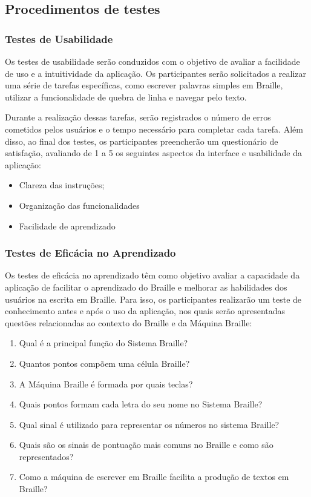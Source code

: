 \subsection{Procedimentos de testes}

\subsubsection{Testes de Usabilidade}

Os testes de usabilidade serão conduzidos com o objetivo de avaliar a facilidade de uso e a intuitividade da aplicação. Os participantes serão solicitados a realizar uma série de tarefas específicas, como escrever palavras simples em Braille, utilizar a funcionalidade de quebra de linha e navegar pelo texto. 

Durante a realização dessas tarefas, serão registrados o número de erros cometidos pelos usuários e o tempo necessário para completar cada tarefa. Além disso, ao final dos testes, os participantes preencherão um questionário de satisfação, avaliando de 1 a 5 os seguintes aspectos da interface e usabilidade da aplicação: 

\begin{itemize}
    \item Clareza das instruções;
    \item Organização das funcionalidades
    \item Facilidade de aprendizado
\end{itemize}

\subsubsection{Testes de Eficácia no Aprendizado}

Os testes de eficácia no aprendizado têm como objetivo avaliar a capacidade da aplicação de facilitar o aprendizado do Braille e melhorar as habilidades dos usuários na escrita em Braille. Para isso, os participantes realizarão um teste de conhecimento antes e após o uso da aplicação, nos quais serão apresentadas questões relacionadas ao contexto do Braille e da Máquina Braille:

\begin{enumerate}
    \item Qual é a principal função do Sistema Braille?
    \item Quantos pontos compõem uma célula Braille?
    \item A Máquina Braille é formada por quais teclas?
    \item Quais pontos formam cada letra do seu nome no Sistema Braille?
    \item Qual sinal é utilizado para representar os números no sistema Braille?
    \item Quais são os sinais de pontuação mais comuns no Braille e como são representados?
    \item Como a máquina de escrever em Braille facilita a produção de textos em Braille?
\end{enumerate}

